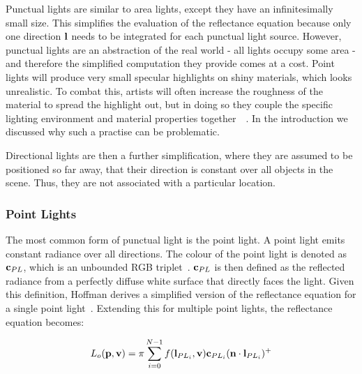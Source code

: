 Punctual lights are similar to area lights, except they have an infinitesimally small size. This simplifies the evaluation of the reflectance equation because only one direction \begin{math}\mathbf{l}\end{math} needs to be integrated for each punctual light source. However, punctual lights are an abstraction of the real world - all lights occupy some area - and therefore the simplified computation they provide comes at a cost. Point lights will produce very small specular highlights on shiny materials, which looks unrealistic. To combat this, artists will often increase the roughness of the material to spread the highlight out, but in doing so they couple the specific lighting environment and material properties together~\cite{MovingFrostbitetoPBR}~\cite{RealShadingInUnreal}. In the introduction we discussed why such a practise can be problematic.

Directional lights are then a further simplification, where they are assumed to be positioned so far away, that their direction is constant over all objects in the scene. Thus, they are not associated with a particular location.

\subsubsection{Point Lights}

The most common form of punctual light is the point light. A point light emits constant radiance over all directions. The colour of the point light is denoted as \begin{math}\mathbf{c}_{PL}\end{math}, which is an unbounded RGB triplet~\cite{HoffmanPBSBackground}. \begin{math}\mathbf{c}_{PL}\end{math} is then defined as the reflected radiance from a perfectly diffuse white surface that directly faces the light. Given this definition, Hoffman derives a simplified version of the reflectance equation for a single point light~\cite{HoffmanPBSBackground}. Extending this for multiple point lights, the reflectance equation becomes:

\begin{equation} \label{eq:PointLightsReflectanceEquation}
	L_o(\mathbf{p}, \mathbf{v}) = \pi\sum_{i = 0}^{N - 1}f(\mathbf{l}_{PL_i}, \mathbf{v})\mathbf{c}_{PL_i}(\mathbf{n}\cdot\mathbf{l}_{PL_i})^+
\end{equation}

